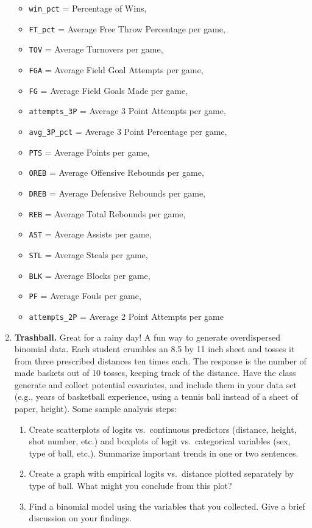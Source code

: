 \documentclass[
]{krantz}
\providecommand{\tightlist}{%
  \setlength{\itemsep}{0pt}\setlength{\parskip}{0pt}}
\begin{document}
\begin{enumerate}
  \begin{itemize}
  \tightlist
  \item
    \texttt{win\_pct} = Percentage of Wins,
  \item
    \texttt{FT\_pct} = Average Free Throw Percentage per game,
  \item
    \texttt{TOV} = Average Turnovers per game,
  \item
    \texttt{FGA} = Average Field Goal Attempts per game,
  \item
    \texttt{FG} = Average Field Goals Made per game,
  \item
    \texttt{attempts\_3P} = Average 3 Point Attempts per game,
  \item
    \texttt{avg\_3P\_pct} = Average 3 Point Percentage per game,
  \item
    \texttt{PTS} = Average Points per game,
  \item
    \texttt{OREB} = Average Offensive Rebounds per game,
  \item
    \texttt{DREB} = Average Defensive Rebounds per game,
  \item
    \texttt{REB} = Average Total Rebounds per game,
  \item
    \texttt{AST} = Average Assists per game,
  \item
    \texttt{STL} = Average Steals per game,
  \item
    \texttt{BLK} = Average Blocks per game,
  \item
    \texttt{PF} = Average Fouls per game,
  \item
    \texttt{attempts\_2P} = Average 2 Point Attempts per game
  \end{itemize}
\item
  \textbf{Trashball.} Great for a rainy day! A fun way to generate overdispersed binomial data. Each student crumbles an 8.5 by 11 inch sheet and tosses it from three prescribed distances ten times each. The response is the number of made baskets out of 10 tosses, keeping track of the distance. Have the class generate and collect potential covariates, and include them in your data set (e.g., years of basketball experience, using a tennis ball instead of a sheet of paper, height). Some sample analysis steps:

  \begin{enumerate}
  \def\labelenumii{\alph{enumii}.}
  \tightlist
  \item
    Create scatterplots of logits vs.~continuous predictors (distance, height, shot number, etc.) and boxplots of logit vs.~categorical variables (sex, type of ball, etc.). Summarize important trends in one or two sentences.
  \item
    Create a graph with empirical logits vs.~distance plotted separately by type of ball. What might you conclude from this plot?
  \item
    Find a binomial model using the variables that you collected. Give a brief discussion on your findings.
  \end{enumerate}
\end{enumerate}
\end{document}
